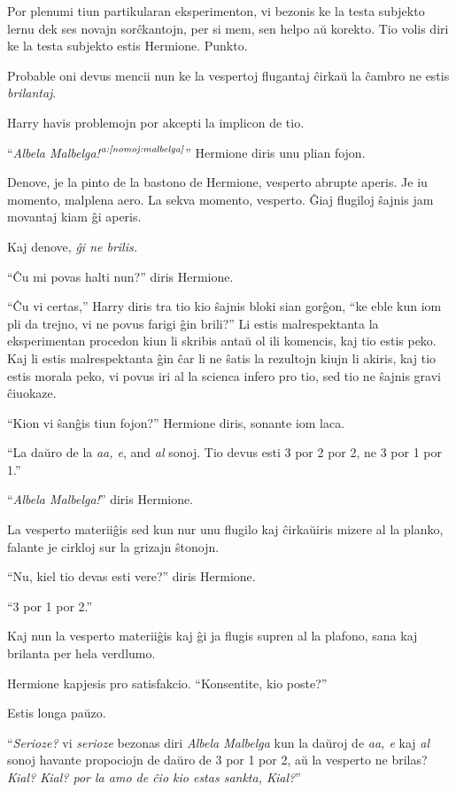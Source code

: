 Por plenumi tiun partikularan eksperimenton, vi bezonis ke la testa
subjekto lernu dek ses novajn sorĉkantojn, per si mem, sen helpo aŭ
korekto. Tio volis diri ke la testa subjekto estis Hermione. Punkto.

Probable oni devus mencii nun ke la vespertoj flugantaj ĉirkaŭ la
ĉambro ne estis \emph{brilantaj}.

Harry havis problemojn por akcepti la implicon de tio.

``\emph{Albela Malbelga!}$^{\textit{a:\ref{nomoj:malbelga}}}$''
Hermione diris unu plian fojon.

Denove, je la pinto de la bastono de Hermione, vesperto abrupte
aperis. Je iu momento, malplena aero. La sekva momento, vesperto. Ĝiaj
flugiloj ŝajnis jam movantaj kiam ĝi aperis.

Kaj denove, \emph{ĝi ne brilis.}

``Ĉu mi povas halti nun?'' diris Hermione.

``Ĉu vi certas,'' Harry diris tra tio kio ŝajnis bloki sian gorĝon,
``ke eble kun iom pli da trejno, vi ne povus farigi ĝin brili?'' Li
estis malrespektanta la eksperimentan procedon kiun li skribis antaŭ
ol ili komencis, kaj tio estis peko. Kaj li estis malrespektanta ĝin ĉar
li ne ŝatis la rezultojn kiujn li akiris, kaj tio estis morala peko,
vi povus iri al la scienca infero pro tio, sed tio ne ŝajnis gravi
ĉiuokaze.

``Kion vi ŝanĝis tiun fojon?'' Hermione diris, sonante iom laca.

``La daŭro de la \emph{aa, e}, and \emph{al} sonoj. Tio devus esti 3 por 2 por 2, ne 3 por 1 por 1.''

``\emph{Albela Malbelga!}'' diris Hermione.

La vesperto materiiĝis sed kun nur unu flugilo kaj ĉirkaŭiris mizere
al la planko, falante je cirkloj sur la grizajn ŝtonojn.

``Nu, kiel tio devas esti vere?'' diris Hermione.

``3 por 1 por 2.''

Kaj nun la vesperto materiiĝis kaj ĝi ja flugis supren al la plafono, sana kaj brilanta per hela verdlumo.

Hermione kapjesis pro satisfakcio. ``Konsentite, kio poste?''

Estis longa paŭzo.

``\emph{Serioze?} vi \emph{serioze} bezonas diri \emph{Albela
  Malbelga} kun la daŭroj de \emph{aa, e} kaj \emph{al} sonoj havante
propociojn de daŭro de 3 por 1 por 2, aŭ la vesperto ne brilas?
\emph{Kial? Kial? por la amo de ĉio kio estas sankta, Kial?}''

